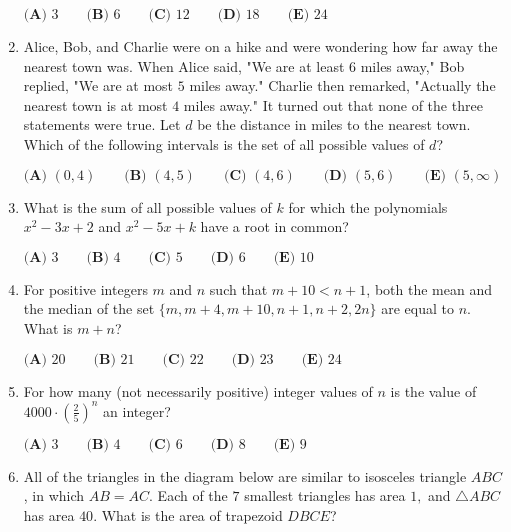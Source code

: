 \documentclass{article}
\begin{document}
\begin{enumerate}[label=\arabic*., itemsep=0.5em]
$\textbf{(A) }3\qquad\textbf{(B) }6\qquad\textbf{(C) }12\qquad\textbf{(D) }18\qquad\textbf{(E) }24$\par \vspace{0.5em}\item Alice, Bob, and Charlie were on a hike and were wondering how far away the nearest town was. When Alice said, "We are at least $6$ miles away," Bob replied, "We are at most $5$ miles away." Charlie then remarked, "Actually the nearest town is at most $4$ miles away." It turned out that none of the three statements were true. Let $d$ be the distance in miles to the nearest town. Which of the following intervals is the set of all possible values of $d$?

$\textbf{(A) }   (0,4)   \qquad        \textbf{(B) }   (4,5)   \qquad    \textbf{(C) }   (4,6)   \qquad   \textbf{(D) }  (5,6)  \qquad  \textbf{(E) }   (5,\infty) $\par \vspace{0.5em}\item What is the sum of all possible values of $k$ for which the polynomials $x^2 - 3x + 2$ and $x^2 - 5x + k$ have a root in common?

$\textbf{(A) }3 \qquad\textbf{(B) }4 \qquad\textbf{(C) }5 \qquad\textbf{(D) }6 \qquad\textbf{(E) }10 \qquad$\par \vspace{0.5em}\item For positive integers $m$ and $n$ such that $m+10<n+1$, both the mean and the median of the set $\{m, m+4, m+10, n+1, n+2, 2n\}$ are equal to $n$. What is $m+n$?

$\textbf{(A) }20\qquad\textbf{(B) }21\qquad\textbf{(C) }22\qquad\textbf{(D) }23\qquad\textbf{(E) }24$\par \vspace{0.5em}\item For how many (not necessarily positive) integer values of $n$ is the value of $4000\cdot \left(\tfrac{2}{5}\right)^n$ an integer?

$
\textbf{(A) }3 \qquad
\textbf{(B) }4 \qquad
\textbf{(C) }6 \qquad
\textbf{(D) }8 \qquad
\textbf{(E) }9 \qquad
$\par \vspace{0.5em}\item All of the triangles in the diagram below are similar to isosceles triangle $ABC$, in which $AB=AC$. Each of the $7$ smallest triangles has area $1,$ and $\triangle ABC$ has area $40$. What is the area of trapezoid $DBCE$?



\end{enumerate}
\end{document}

